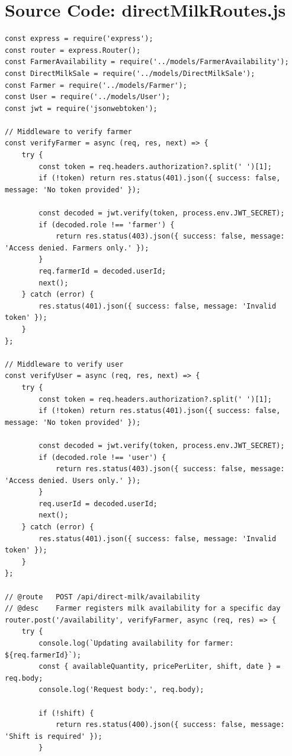 \documentclass[12pt,a4paper]{report}
\begin{document}
\section{Source Code: directMilkRoutes.js}
\begin{lstlisting}
const express = require('express');
const router = express.Router();
const FarmerAvailability = require('../models/FarmerAvailability');
const DirectMilkSale = require('../models/DirectMilkSale');
const Farmer = require('../models/Farmer');
const User = require('../models/User');
const jwt = require('jsonwebtoken');

// Middleware to verify farmer
const verifyFarmer = async (req, res, next) => {
    try {
        const token = req.headers.authorization?.split(' ')[1];
        if (!token) return res.status(401).json({ success: false, message: 'No token provided' });

        const decoded = jwt.verify(token, process.env.JWT_SECRET);
        if (decoded.role !== 'farmer') {
            return res.status(403).json({ success: false, message: 'Access denied. Farmers only.' });
        }
        req.farmerId = decoded.userId;
        next();
    } catch (error) {
        res.status(401).json({ success: false, message: 'Invalid token' });
    }
};

// Middleware to verify user
const verifyUser = async (req, res, next) => {
    try {
        const token = req.headers.authorization?.split(' ')[1];
        if (!token) return res.status(401).json({ success: false, message: 'No token provided' });

        const decoded = jwt.verify(token, process.env.JWT_SECRET);
        if (decoded.role !== 'user') {
            return res.status(403).json({ success: false, message: 'Access denied. Users only.' });
        }
        req.userId = decoded.userId;
        next();
    } catch (error) {
        res.status(401).json({ success: false, message: 'Invalid token' });
    }
};

// @route   POST /api/direct-milk/availability
// @desc    Farmer registers milk availability for a specific day
router.post('/availability', verifyFarmer, async (req, res) => {
    try {
        console.log(`Updating availability for farmer: ${req.farmerId}`);
        const { availableQuantity, pricePerLiter, shift, date } = req.body;
        console.log('Request body:', req.body);

        if (!shift) {
            return res.status(400).json({ success: false, message: 'Shift is required' });
        }


\end{lstlisting}
\end{document}
